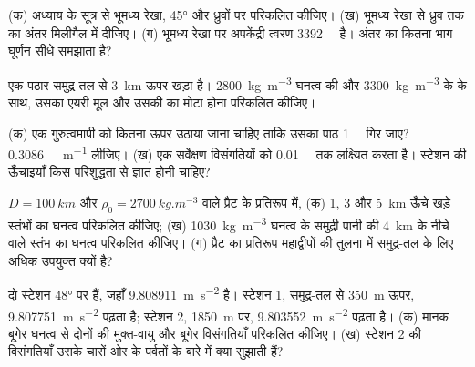 \begin{exercise}[$\star$]\label{exo:b1:isostasy-gravity:2}
  (क) अध्याय के सूत्र से भूमध्य रेखा, \ang{45} और ध्रुवों पर  परिकलित कीजिए। (ख) भूमध्य रेखा से ध्रुव तक का अंतर मिलीगैल में दीजिए। (ग) भूमध्य रेखा पर अपकेंद्री त्वरण \qty{3392}{\milli\gal} है। अंतर का कितना भाग घूर्णन सीधे समझाता है?
\end{exercise}

\begin{exercise}[$\star$]\label{exo:b1:isostasy-gravity:3}
एक पठार समुद्र-तल से \qty{3}{km} ऊपर खड़ा है। \qty{2800}{kg.m^{-3}} घनत्व की  और \qty{3300}{kg.m^{-3}} के  के साथ, उसका एयरी मूल और उसकी  का मोटा होना परिकलित कीजिए।
\end{exercise}

\begin{exercise}[$\star$]\label{exo:b1:isostasy-gravity:4}
(क) एक गुरुत्वमापी को कितना ऊपर उठाया जाना चाहिए ताकि उसका पाठ \qty{1}{\milli\gal} गिर जाए? \qty{0.3086}{\milli\gal.m^{-1}} लीजिए। (ख) एक सर्वेक्षण विसंगतियों को \qty{0.01}{\milli\gal} तक लक्ष्यित करता है। स्टेशन की ऊँचाइयाँ किस परिशुद्धता से ज्ञात होनी चाहिए?
\end{exercise}

\begin{exercise}[$\star\star$]\label{exo:b1:isostasy-gravity:5}
$D = \qty{100}{km}$ और $\rho_0 = \qty{2700}{kg.m^{-3}}$ वाले प्रैट के प्रतिरूप में, (क) 1, 3 और \qty{5}{km} ऊँचे खड़े स्तंभों का घनत्व परिकलित कीजिए; (ख) \qty{1030}{kg.m^{-3}} घनत्व के समुद्री पानी की \qty{4}{km} के नीचे वाले स्तंभ का घनत्व परिकलित कीजिए। (ग) प्रैट का प्रतिरूप महाद्वीपों की तुलना में समुद्र-तल के लिए अधिक उपयुक्त क्यों है?
\end{exercise}

\begin{exercise}[$\star\star$]\label{exo:b1:isostasy-gravity:6}
दो स्टेशन \ang{48}  पर हैं, जहाँ  \qty{9.808911}{m.s^{-2}} है। स्टेशन 1, समुद्र-तल से \qty{350}{m} ऊपर, \qty{9.807751}{m.s^{-2}} पढ़ता है; स्टेशन 2, \qty{1850}{m} पर, \qty{9.803552}{m.s^{-2}} पढ़ता है। (क) मानक बूगेर घनत्व से दोनों की मुक्त-वायु और बूगेर विसंगतियाँ परिकलित कीजिए। (ख) स्टेशन 2 की विसंगतियाँ उसके चारों ओर के पर्वतों के बारे में क्या सुझाती हैं?
\end{exercise}

